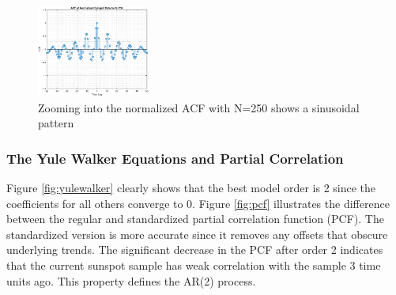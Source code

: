 \documentclass{article}
\begin{document}
\begin{figure}[h!]
\centering
\includegraphics[width = 0.33\textwidth]{sunspot_acf_250_zoom}
\caption{Zooming into the normalized ACF with N=250 shows a sinusoidal pattern}
\label{fig:sunspot_acf_250_zoom}
\end{figure}

\pagebreak

\subsubsection{The Yule Walker Equations and Partial Correlation}

Figure \ref{fig:yulewalker} clearly shows that the best model order is 2 since the coefficients for all others converge to 0. Figure \ref{fig:pcf} illustrates the difference between the regular and standardized partial correlation function (PCF). The standardized version is more accurate since it removes any offsets that obscure underlying trends. The significant decrease in the PCF after order 2 indicates that the current sunspot sample has weak correlation with the sample 3 time units ago. This property defines the AR(2) process.
\end{document}
